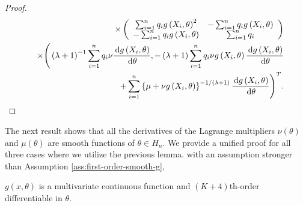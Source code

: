 \begin{proof}
\begin{eqnarray}
 &  & \times\left(\begin{array}{cc}
\sum_{i=1}^{n}q_{i}g\left(X_{i},\theta\right)^{2} & -\sum_{i=1}^{n}q_{i}g\left(X_{i},\theta\right)\\
-\sum_{i=1}^{n}q_{i}g\left(X_{i},\theta\right) & \sum_{i=1}^{n}q_{i}
\end{array}\right)\nonumber \\
& & \times \Bigg(\left(\lambda+1\right)^{-1}\sum_{i=1}^{n}q_{i}\nu\frac{\,\mathrm{d} g\left(X_{i},\theta\right)}{\,\mathrm{d}\theta}, -\left(\lambda+1\right)\sum_{i=1}^{n}q_{i}\nu g\left(X_{i},\theta\right)\frac{\,\mathrm{d} g\left(X_{i},\theta\right)}{\,\mathrm{d}\theta}\nonumber \\
 &  & 
+\sum_{i=1}^{n}\left\{ \mu+\nu g\left(X_{i},\theta\right)\right\} ^{-1/(\lambda+1)}\frac{\,\mathrm{d} g\left(X_{i},\theta\right)}{\,\mathrm{d}\theta}
\Bigg)^T .\label{eq:first-der-lag-mul-crel}
\end{eqnarray}

\end{proof}
The next result shows that all the derivatives of the Lagrange multipliers
$\nu\left(\theta\right)$ and $\mu\left(\theta\right)$ are smooth
functions of $\theta\in H_n$. We provide a unified proof for all three
cases where we utilize the previous lemma. with an assumption stronger than Assumption \ref{ass:first-order-smooth-g},
\begin{assumption}
\label{ass:high-order-smooth-g}
$g(x,\theta)$ is a multivariate continuous function and $(K+4)$th-order differentiable in $\theta$.
\end{assumption}

